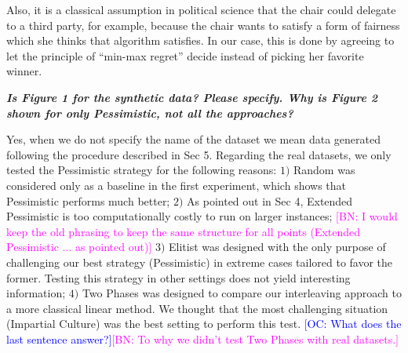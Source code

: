 \documentclass{article}
\newcommand{\commentOC}[1]{\textcolor{blue}{\small$\big[$OC: #1$\big]$}}
\newcommand{\commentBN}[1]{\textcolor{magenta}{\small$\big[$BN: #1$\big]$}}
\begin{document}
Also, it is a classical assumption in political science that the chair could delegate to a third party, for example, because the chair wants to satisfy a form of fairness which she thinks that algorithm satisfies. In our case, this is done by agreeing to let the principle of “min-max regret” decide instead of picking her favorite winner.

\textit{\textbf{}}


\textit{\textbf{Is Figure 1 for the synthetic data? Please specify. Why is Figure 2 shown for only Pessimistic, not all the approaches?}}

Yes, when we do not specify the name of the dataset we mean data generated following the procedure described in Sec 5. Regarding the real datasets, we only tested the Pessimistic strategy for the following reasons: $1)$ Random was considered only as a baseline in the first experiment, which shows that Pessimistic performs much better; $2)$ As pointed out in Sec 4, Extended Pessimistic is too computationally costly to run on larger instances; \commentBN{I would keep the old phrasing to keep the same structure for all points (Extended Pessimistic ... as pointed out)} $3)$ Elitist was designed with the only purpose of challenging our best strategy (Pessimistic) in extreme cases tailored to favor the former. Testing this strategy in other settings does not yield interesting information; $4)$ Two Phases was designed to compare our interleaving approach to a more classical linear method. We thought that the most challenging situation (Impartial Culture) was the best setting to perform this test. \commentOC{What does the last sentence answer?}\commentBN{To why we didn't test Two Phases with real datasets.}
\end{document}
